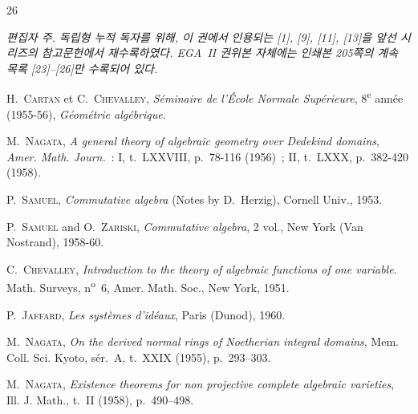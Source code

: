 \clearpage
{}
{}
\renewcommand{\bibname}{참고문헌 \textit{(계속)}}

\begin{thebibliography}{26}

\item[]\noindent\textit{편집자 주. 독립형 누적 독자를 위해, 이 권에서
인용되는 [1], [9], [11], [13]을 앞선 시리즈의 참고문헌에서 재수록하였다.
EGA~II 권위본 자체에는 인쇄본 205쪽의 계속 목록 [23]--[26]만 수록되어
있다.}
\par\medskip

H.~\textsc{Cartan} et C.~\textsc{Chevalley},
\emph{Séminaire de l'École Normale Supérieure},
8\textsuperscript{e} année (1955-56), \emph{Géométrie algébrique}.

M.~\textsc{Nagata},
\emph{A general theory of algebraic geometry over Dedekind domains},
\emph{Amer. Math. Journ.}~: I, t.~LXXVIII, p.~78-116 (1956)~; II, t.~LXXX,
p.~382-420 (1958).

P.~\textsc{Samuel}, \emph{Commutative algebra} (Notes by D.~Herzig), Cornell
Univ., 1953.

P.~\textsc{Samuel} and O.~\textsc{Zariski},
\emph{Commutative algebra}, 2 vol., New York (Van Nostrand), 1958-60.

C.~\textsc{Chevalley},
\emph{Introduction to the theory of algebraic functions of one variable}.
Math. Surveys, n\textsuperscript{o}~6, Amer. Math. Soc., New York, 1951.

P.~\textsc{Jaffard},
\emph{Les systèmes d'idéaux}, Paris (Dunod), 1960.

M.~\textsc{Nagata},
\emph{On the derived normal rings of Noetherian integral domains},
Mem. Coll. Sci. Kyoto, sér.~A, t.~XXIX (1955), p.~293--303.

M.~\textsc{Nagata},
\emph{Existence theorems for non projective complete algebraic varieties},
Ill. J. Math., t.~II (1958), p.~490--498.

\end{thebibliography}
